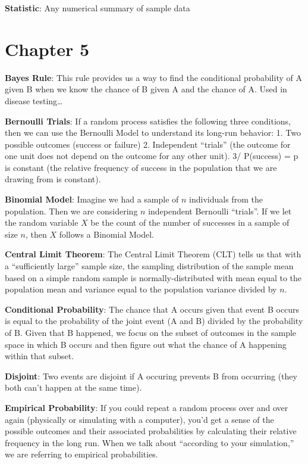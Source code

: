 \documentclass[]{book}
\begin{document}
\textbf{Statistic}: Any numerical summary of sample data

\hypertarget{chapter-5}{%
\section{Chapter 5}\label{chapter-5}}

\textbf{Bayes Rule}: This rule provides us a way to find the conditional probability of A given B when we know the chance of B given A and the chance of A. Used in disease testing\ldots{}

\textbf{Bernoulli Trials}: If a random process satisfies the following three conditions, then we can use the Bernoulli Model to understand its long-run behavior: 1. Two possible outcomes (success or failure) 2. Independent ``trials'' (the outcome for one unit does not depend on the outcome for any other unit). 3/ P(success) = p is constant (the relative frequency of success in the population that we are drawing from is constant).

\textbf{Binomial Model}: Imagine we had a sample of \(n\) individuals from the population. Then we are considering \(n\) independent Bernoulli ``trials''. If we let the random variable \(X\) be the count of the number of successes in a sample of size \(n\), then \(X\) follows a Binomial Model.

\textbf{Central Limit Theorem}: The Central Limit Theorem (CLT) tells us that with a ``sufficiently large'' sample size, the sampling distribution of the sample mean based on a simple random sample is normally-distributed with mean equal to the population mean and variance equal to the population variance divided by \(n\).

\textbf{Conditional Probability}: The chance that A occurs given that event B occurs is equal to the probability of the joint event (A and B) divided by the probability of B. Given that B happened, we focus on the subset of outcomes in the sample space in which B occurs and then figure out what the chance of A happening within that subset.

\textbf{Disjoint}: Two events are disjoint if A occuring prevents B from occurring (they both can't happen at the same time).

\textbf{Empirical Probability}: If you could repeat a random process over and over again (physically or simulating with a computer), you'd get a sense of the possible outcomes and their associated probabilities by calculating their relative frequency in the long run. When we talk about ``according to your simulation,'' we are referring to empirical probabilities.
\end{document}
